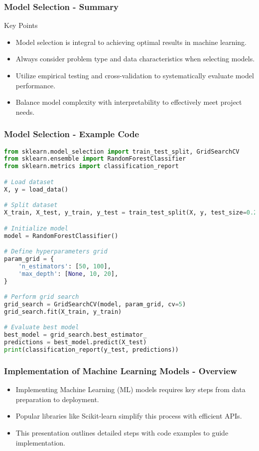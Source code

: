 \documentclass[aspectratio=169]{beamer}
\begin{document}
\begin{frame}[fragile]
    \frametitle{Model Selection - Summary}
    \begin{block}{Key Points}
        \begin{itemize}
            \item Model selection is integral to achieving optimal results in machine learning.
            \item Always consider problem type and data characteristics when selecting models.
            \item Utilize empirical testing and cross-validation to systematically evaluate model performance.
            \item Balance model complexity with interpretability to effectively meet project needs.
        \end{itemize}
    \end{block}
\end{frame}

\begin{frame}[fragile]
    \frametitle{Model Selection - Example Code}
    \begin{lstlisting}[language=Python]
from sklearn.model_selection import train_test_split, GridSearchCV
from sklearn.ensemble import RandomForestClassifier
from sklearn.metrics import classification_report

# Load dataset
X, y = load_data()

# Split dataset
X_train, X_test, y_train, y_test = train_test_split(X, y, test_size=0.2, random_state=42)

# Initialize model
model = RandomForestClassifier()

# Define hyperparameters grid
param_grid = {
    'n_estimators': [50, 100],
    'max_depth': [None, 10, 20],
}

# Perform grid search
grid_search = GridSearchCV(model, param_grid, cv=5)
grid_search.fit(X_train, y_train)

# Evaluate best model
best_model = grid_search.best_estimator_
predictions = best_model.predict(X_test)
print(classification_report(y_test, predictions))
    \end{lstlisting}
\end{frame}

\begin{frame}
    \frametitle{Implementation of Machine Learning Models - Overview}
    \begin{itemize}
        \item Implementing Machine Learning (ML) models requires key steps from data preparation to deployment.
        \item Popular libraries like Scikit-learn simplify this process with efficient APIs.
        \item This presentation outlines detailed steps with code examples to guide implementation.
    \end{itemize}
\end{frame}
\end{document}

